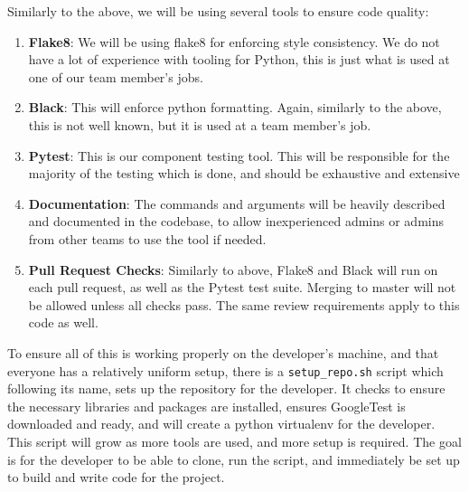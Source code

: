 \medskip

Similarly to the above, we will be using several tools to ensure code quality:
\begin{enumerate}
  \item \textbf{Flake8}: We will be using flake8 for enforcing style consistency. We do not have a lot of experience with tooling for Python, this is just what is used at one of our team member's jobs.
  \item \textbf{Black}: This will enforce python formatting. Again, similarly to the above, this is not well known, but it is used at a team member's job.
  \item \textbf{Pytest}: This is our component testing tool. This will be responsible for the majority of the testing which is done, and should be exhaustive and extensive
  \item \textbf{Documentation}: The commands and arguments will be heavily described and documented in the codebase, to allow inexperienced admins or admins from other teams to use the tool if needed.
  \item \textbf{Pull Request Checks}: Similarly to above, Flake8 and Black will run on each pull request, as well as the Pytest test suite. Merging to master will not be allowed unless all checks pass. The same review requirements apply to this code as well.
\end{enumerate}

To ensure all of this is working properly on the developer's machine, and that everyone has a relatively uniform setup, there is a \verb|setup_repo.sh| script which following its name, sets up the repository for the developer. It checks to ensure the necessary libraries and packages are installed, ensures GoogleTest is downloaded and ready, and will create a python virtualenv for the developer. This script will grow as more tools are used, and more setup is required. The goal is for the developer to be able to clone, run the script, and immediately be set up to build and write code for the project.